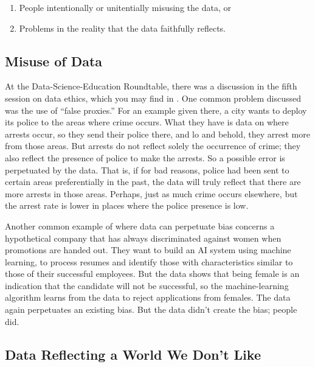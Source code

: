 \documentclass[11pt]{article}
\begin{document}
\begin{enumerate}

\item
People intentionally or unitentially misusing the data, or

\item
Problems in the reality that the data faithfully reflects.

\end{enumerate}

\subsection{Misuse of Data}

At the Data-Science-Education Roundtable, there was a discussion in the fifth session on data ethics, which you may find in \cite{ethics}.  One common problem discussed was the use of ``false proxies.''  For an example given there, a city wants to deploy its police to the areas where crime occurs.  What they have is data on where arrests occur, so they send their police there, and lo and behold, they arrest more from those areas.  But arrests do not reflect solely the occurrence of crime; they also reflect the presence of police to make the arrests.  So a possible error is perpetuated by the data.  That is, if for bad reasons, police had been sent to certain areas preferentially in the past, the data will truly reflect that there are more arrests in those areas.  Perhaps, just as much crime occurs elsewhere, but the arrest rate is lower in places where the police presence is low.

Another common example of where data can perpetuate bias concerns a hypothetical company that has always discriminated against women when promotions are handed out.  They want to build an AI system using machine learning, to process resumes and identify those with characteristics similar to those of their successful employees.  But the data shows that being female is an indication that the candidate will not be successful, so the machine-learning algorithm learns from the data to reject applications from females.   The data again perpetuates an existing bias.  But the data didn't create the bias; people did.

\subsection{Data Reflecting a World We Don't Like}
\end{document}
